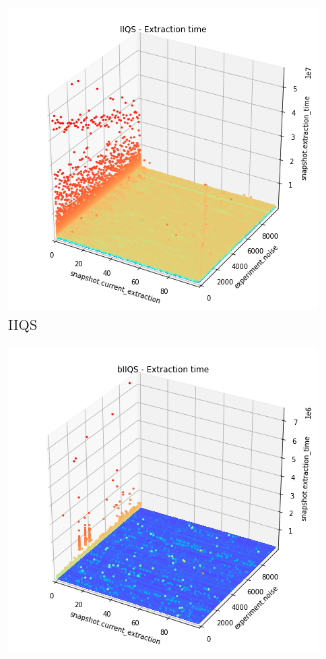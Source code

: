 \begin{figure}
    \centering
    \begin{subfigure}[b]{0.45\textwidth}
        \centering
        \includegraphics[width=0.9\textwidth]{./fragments/05_workhorse_experiment/images/01_basebenchmark_06_noise_bias.png.1_0.png}
        \caption{IIQS}
        \label{FIG:WORKHORSE_BENCHMARK_07__0_0}
    \end{subfigure}
    \hfill
    \begin{subfigure}[b]{0.45\textwidth}
        \centering
        \includegraphics[width=0.9\textwidth]{./fragments/05_workhorse_experiment/images/01_basebenchmark_06_noise_bias.png.0_0.png}

\end{subfigure}
\end{figure}
